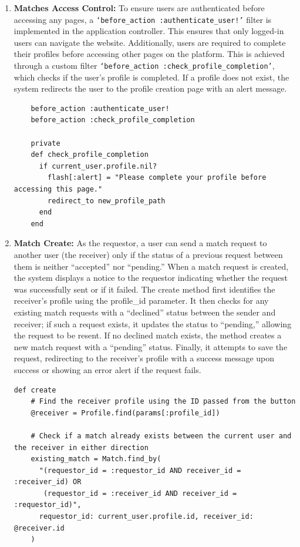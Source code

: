     \begin{enumerate}
    \item \textbf{Matches Access Control:} 
    To ensure users are authenticated before accessing any pages, a \texttt{`before\_action :authenticate\_user!'} filter is implemented in the application controller. This ensures that only logged-in users can navigate the website. Additionally, users are required to complete their profiles before accessing other pages on the platform. This is achieved through a custom filter \texttt{`before\_action :check\_profile\_completion'}, which checks if the user’s profile is completed. If a profile does not exist, the system redirects the user to the profile creation page with an alert message.
    \begin{lstlisting}
    before_action :authenticate_user!
    before_action :check_profile_completion
    
    private
    def check_profile_completion
      if current_user.profile.nil?
        flash[:alert] = "Please complete your profile before accessing this page."
        redirect_to new_profile_path
      end
    end
    \end{lstlisting}

    \newpage
    \item \textbf{Match Create:} 
    As the requestor, a user can send a match request to another user (the receiver) only if the status of a previous request between them is neither “accepted” nor “pending.” When a match request is created, the system displays a notice to the requestor indicating whether the request was successfully sent or if it failed. The create method first identifies the receiver’s profile using the profile\_id parameter. It then checks for any existing match requests with a “declined” status between the sender and receiver; if such a request exists, it updates the status to “pending,” allowing the request to be resent. If no declined match exists, the method creates a new match request with a “pending” status. Finally, it attempts to save the request, redirecting to the receiver’s profile with a success message upon success or showing an error alert if the request fails.
    \begin{lstlisting}
def create
    # Find the receiver profile using the ID passed from the button
    @receiver = Profile.find(params[:profile_id])
  
    # Check if a match already exists between the current user and the receiver in either direction
    existing_match = Match.find_by(
      "(requestor_id = :requestor_id AND receiver_id = :receiver_id) OR 
       (requestor_id = :receiver_id AND receiver_id = :requestor_id)",
      requestor_id: current_user.profile.id, receiver_id: @receiver.id
    )
  

\end{lstlisting}
\end{enumerate}
